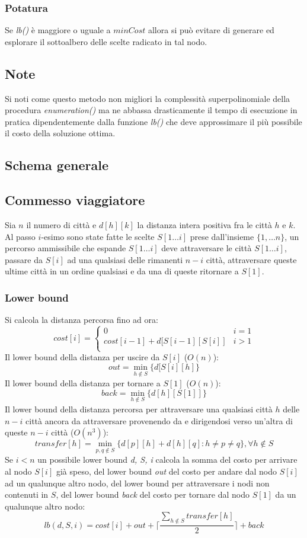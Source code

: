 \subsubsection{Potatura}
Se \emph{lb()} \`e maggiore o uguale a $minCost$ allora si pu\`o evitare di generare ed esplorare il sottoalbero delle scelte radicato in tal nodo.
\subsection{Note}
Si noti come questo metodo non migliori la complessit\`a superpolinomiale della procedura \emph{enumeration()} ma ne abbassa drasticamente il tempo di esecuzione in pratica 
dipendentemente dalla funzione \emph{lb()} che deve approssimare il pi\`u possibile il costo della soluzione ottima. 
\subsection{Schema generale}

\subsection{Commesso viaggiatore}
Sia $n$ il numero di citt\`a e $d[h][k]$ la distanza intera positiva fra le citt\`a $h$ e $k$. Al passo $i$-esimo sono state fatte le scelte $S[1\dots i]$ prese dall'insieme 
$\{1,\dots n\}$, un percorso ammissibile che espande $S[1\dots i]$ deve attraversare le citt\`a $S[1\dots i]$, passare da $S[i]$ ad una qualsiasi delle rimanenti $n-i$ citt\`a, 
attraversare queste ultime citt\`a in un ordine qualsiasi e da una di queste ritornare a $S[1]$. 
\subsubsection{Lower bound}
Si calcola la distanza percorsa fino ad ora:
$$cost[i] = 
\begin{cases}
	0 & i = 1\\
	cost[i - 1] + d[S[i - 1][S[i]] & i > 1\\
\end{cases}$$
Il lower bound della distanza per uscire da $S[i]$ ($O(n)$):
$$out = \min\limits_{h\not\in S}\{d[S[i][h]\}$$
Il lower bound della distanza per tornare a $S[1]$ ($O(n)$):
$$back = \min\limits_{h\not\in S}\{d[h][S[1]]\}$$
Il lower bound della distanza percorsa per attraversare una qualsiasi citt\`a $h$ delle $n-i$ citt\`a ancora da attraversare provenendo da e dirigendosi verso un'altra di queste $n-i$
citt\`a ($O(n^3)$):
$$transfer[h] = \min\limits_{p, q\not\in S}\{d[p][h] + d[h][q] : h\neq p\neq q\}, \forall h\not\in S$$
Se $i<n$ un possibile lower bound \emph{d, S, i} calcola la somma del costo per arrivare al nodo $S[i]$ gi\`a speso, del lower bound \emph{out} del costo per andare dal nodo $S[i]$ ad un
qualunque altro nodo, del lower bound per attraversare i nodi non contenuti in $S$, del lower bound \emph{back} del costo per tornare dal nodo $S[1]$ da un qualunque altro nodo:
$$lb(d, S, i) = cost[i] + out +\biggl\lceil\dfrac{\sum\limits_{h\not\in S}transfer[h]}{2}\biggr\rceil + back$$
